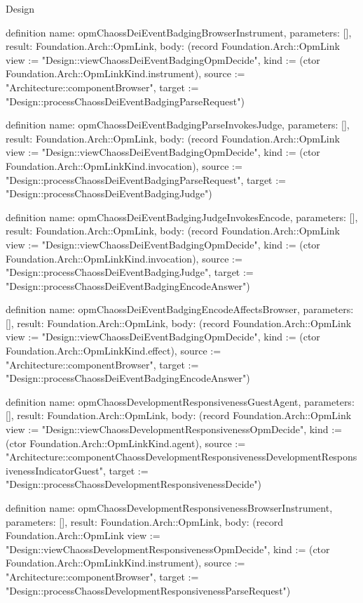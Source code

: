 \begin{lexlean}{Design}
\begin{semanticmodule}
definition{
  name: opmChaossDeiEventBadgingBrowserInstrument,
  parameters: [],
  result: Foundation.Arch::OpmLink,
  body: (record Foundation.Arch::OpmLink {view := "Design::viewChaossDeiEventBadgingOpmDecide", kind := (ctor Foundation.Arch::OpmLinkKind.instrument), source := "Architecture::componentBrowser", target := "Design::processChaossDeiEventBadgingParseRequest"})
}

definition{
  name: opmChaossDeiEventBadgingParseInvokesJudge,
  parameters: [],
  result: Foundation.Arch::OpmLink,
  body: (record Foundation.Arch::OpmLink {view := "Design::viewChaossDeiEventBadgingOpmDecide", kind := (ctor Foundation.Arch::OpmLinkKind.invocation), source := "Design::processChaossDeiEventBadgingParseRequest", target := "Design::processChaossDeiEventBadgingJudge"})
}

definition{
  name: opmChaossDeiEventBadgingJudgeInvokesEncode,
  parameters: [],
  result: Foundation.Arch::OpmLink,
  body: (record Foundation.Arch::OpmLink {view := "Design::viewChaossDeiEventBadgingOpmDecide", kind := (ctor Foundation.Arch::OpmLinkKind.invocation), source := "Design::processChaossDeiEventBadgingJudge", target := "Design::processChaossDeiEventBadgingEncodeAnswer"})
}

definition{
  name: opmChaossDeiEventBadgingEncodeAffectsBrowser,
  parameters: [],
  result: Foundation.Arch::OpmLink,
  body: (record Foundation.Arch::OpmLink {view := "Design::viewChaossDeiEventBadgingOpmDecide", kind := (ctor Foundation.Arch::OpmLinkKind.effect), source := "Architecture::componentBrowser", target := "Design::processChaossDeiEventBadgingEncodeAnswer"})
}

definition{
  name: opmChaossDevelopmentResponsivenessGuestAgent,
  parameters: [],
  result: Foundation.Arch::OpmLink,
  body: (record Foundation.Arch::OpmLink {view := "Design::viewChaossDevelopmentResponsivenessOpmDecide", kind := (ctor Foundation.Arch::OpmLinkKind.agent), source := "Architecture::componentChaossDevelopmentResponsivenessDevelopmentResponsivenessIndicatorGuest", target := "Design::processChaossDevelopmentResponsivenessDecide"})
}

definition{
  name: opmChaossDevelopmentResponsivenessBrowserInstrument,
  parameters: [],
  result: Foundation.Arch::OpmLink,
  body: (record Foundation.Arch::OpmLink {view := "Design::viewChaossDevelopmentResponsivenessOpmDecide", kind := (ctor Foundation.Arch::OpmLinkKind.instrument), source := "Architecture::componentBrowser", target := "Design::processChaossDevelopmentResponsivenessParseRequest"})
}


\end{semanticmodule}
\end{lexlean}
